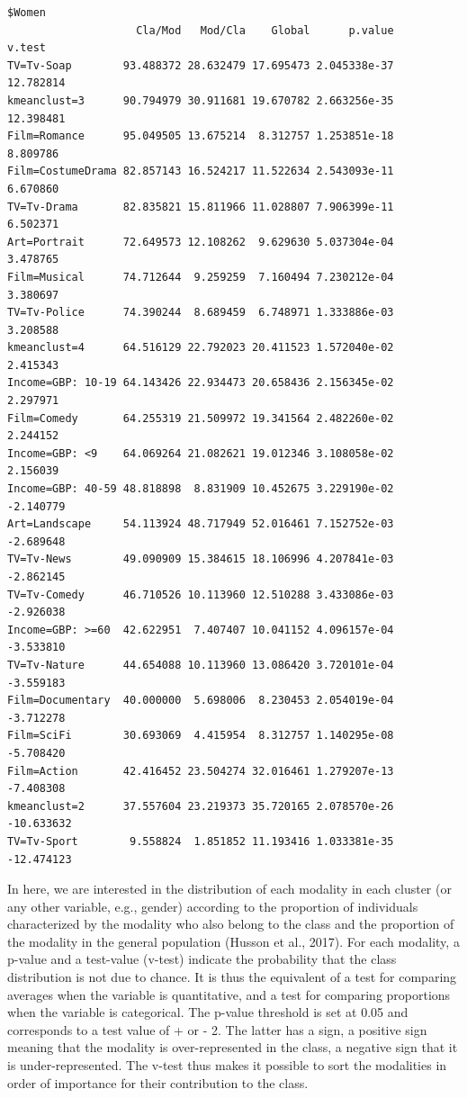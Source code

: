 \documentclass[
  letterpaper,
  DIV=11,
  numbers=noendperiod]{scrartcl}
\begin{document}
\begin{verbatim}
$Women
                    Cla/Mod   Mod/Cla    Global      p.value     v.test
TV=Tv-Soap        93.488372 28.632479 17.695473 2.045338e-37  12.782814
kmeanclust=3      90.794979 30.911681 19.670782 2.663256e-35  12.398481
Film=Romance      95.049505 13.675214  8.312757 1.253851e-18   8.809786
Film=CostumeDrama 82.857143 16.524217 11.522634 2.543093e-11   6.670860
TV=Tv-Drama       82.835821 15.811966 11.028807 7.906399e-11   6.502371
Art=Portrait      72.649573 12.108262  9.629630 5.037304e-04   3.478765
Film=Musical      74.712644  9.259259  7.160494 7.230212e-04   3.380697
TV=Tv-Police      74.390244  8.689459  6.748971 1.333886e-03   3.208588
kmeanclust=4      64.516129 22.792023 20.411523 1.572040e-02   2.415343
Income=GBP: 10-19 64.143426 22.934473 20.658436 2.156345e-02   2.297971
Film=Comedy       64.255319 21.509972 19.341564 2.482260e-02   2.244152
Income=GBP: <9    64.069264 21.082621 19.012346 3.108058e-02   2.156039
Income=GBP: 40-59 48.818898  8.831909 10.452675 3.229190e-02  -2.140779
Art=Landscape     54.113924 48.717949 52.016461 7.152752e-03  -2.689648
TV=Tv-News        49.090909 15.384615 18.106996 4.207841e-03  -2.862145
TV=Tv-Comedy      46.710526 10.113960 12.510288 3.433086e-03  -2.926038
Income=GBP: >=60  42.622951  7.407407 10.041152 4.096157e-04  -3.533810
TV=Tv-Nature      44.654088 10.113960 13.086420 3.720101e-04  -3.559183
Film=Documentary  40.000000  5.698006  8.230453 2.054019e-04  -3.712278
Film=SciFi        30.693069  4.415954  8.312757 1.140295e-08  -5.708420
Film=Action       42.416452 23.504274 32.016461 1.279207e-13  -7.408308
kmeanclust=2      37.557604 23.219373 35.720165 2.078570e-26 -10.633632
TV=Tv-Sport        9.558824  1.851852 11.193416 1.033381e-35 -12.474123
\end{verbatim}

\normalsize

In here, we are interested in the distribution of each modality in each
cluster (or any other variable, e.g., gender) according to the
proportion of individuals characterized by the modality who also belong
to the class and the proportion of the modality in the general
population (Husson et al., 2017). For each modality, a p-value and a
test-value (v-test) indicate the probability that the class distribution
is not due to chance. It is thus the equivalent of a test for comparing
averages when the variable is quantitative, and a test for comparing
proportions when the variable is categorical. The p-value threshold is
set at 0.05 and corresponds to a test value of + or - 2. The latter has
a sign, a positive sign meaning that the modality is over-represented in
the class, a negative sign that it is under-represented. The v-test thus
makes it possible to sort the modalities in order of importance for
their contribution to the class.
\end{document}
